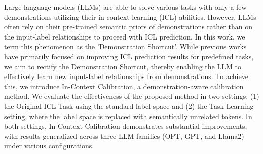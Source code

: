 Large language models (LLMs) are able to solve various tasks with only a few demonstrations utilizing their in-context learning (ICL) abilities. However, LLMs often rely on their pre-trained semantic priors of demonstrations rather than on the input-label relationships to proceed with ICL prediction.  In this work, we term this phenomenon as the 'Demonstration Shortcut'. While previous works have primarily focused on improving ICL prediction results for predefined tasks, we aim to rectify the Demonstration Shortcut, thereby enabling the LLM to effectively learn new input-label relationships from demonstrations. To achieve this, we introduce In-Context Calibration, a demonstration-aware calibration method. We evaluate the effectiveness of the proposed method in two settings: (1) the Original ICL Task using the standard label space and (2) the Task Learning setting, where the label space is replaced with semantically unrelated tokens. In both settings, In-Context Calibration demonstrates substantial improvements, with results generalized across three LLM families (OPT, GPT, and Llama2) under various configurations.